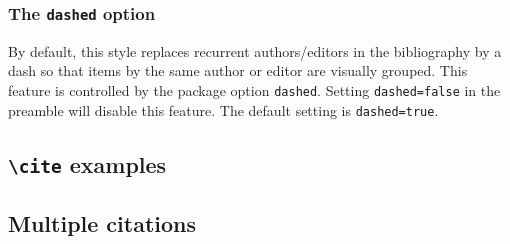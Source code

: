\documentclass[a4paper]{article}
\newcommand{\cmd}[1]{\texttt{\textbackslash #1}}
\begin{document}
\subsubsection*{The \texttt{dashed} option}

By default, this style replaces recurrent authors/editors in the
bibliography by a dash so that items by the same author or editor
are visually grouped. This feature is controlled by the package
option \texttt{dashed}. Setting \texttt{dashed=false} in the
preamble will disable this feature. The default setting is
\texttt{dashed=true}.

\subsection*{\cmd{cite} examples}

\cite{averroes/bland}

\cite{aristotle:physics}

\cite{aristotle:rhetoric}

\cite{aristotle:rhetoric}

\subsection*{Multiple citations}

\cite{aristotle:rhetoric,averroes/bland,aristotle:physics,aristotle:poetics}

\clearpage
\printbibliography
\end{document}

